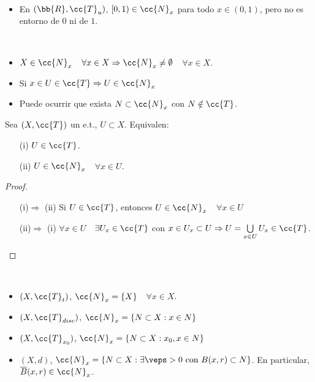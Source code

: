 \begin{ejemplo}\
    \begin{itemize}
        \item En $(\bb{R}, \cc{T}_u)$, $[0,1)\in \cc{N}_x$ para todo $x\in (0,1)$, pero no es entorno de $0$ ni de $1$.
    \end{itemize}
    \endsquare
\end{ejemplo}

\begin{observacion}\
    \begin{itemize}
        \item $X\in \cc{N}_x$\ \ $\forall x \in X\Rightarrow \cc{N}_x\neq \emptyset$\ \ $\forall x\in X$.
        \item Si $x\in U \in \cc{T}\Rightarrow U\in \cc{N}_x$
        \item Puede ocurrir que exista $N\subset \cc{N}_x$ con $N\notin \cc{T}$.
    \end{itemize}
    \endsquare
\end{observacion}

\begin{prop}
    Sea $(X,\cc{T})$ un e.t., $U\subset X$. Equivalen:
    \begin{enumerate}
        \item[(i)] $U\in \cc{T}$.
        \item[(ii)] $U\in \cc{N}_x$\ \ $\forall x \in U$.
    \end{enumerate}

    \begin{proof}\
        \begin{enumerate}
            \item[(i)$\Rightarrow$ (ii)] Si $U\in \cc{T}$, entonces $U\in \cc{N}_x$\ \ $\forall x\in U$
            \item[(ii)$\Rightarrow$ (i)] $\forall x \in U $\ \ $\exists U_x \in \cc{T}$ con $x\in U_x\subset U \Rightarrow U = \bigcup\limits_{x\in U}U_x \in \cc{T}$.
        \end{enumerate}
    \end{proof}
\end{prop}

\begin{ejemplo}\
    \begin{itemize}   
        \item $(X,\cc{T}_t)$, $\cc{N}_x=\{X\}$\ \ $\forall x \in X$.
        \item $(X,\cc{T}_{disc})$, $\cc{N}_x=\{N\subset X : x\in N\}$
        \item $(X,\cc{T}_{x_0})$, $\cc{N}_x = \{N \subset X : x_0,x\in N\}$
        \item $(X,d)$, $\cc{N}_x = \{N\subset X : \exists \veps > 0 \text{ con } B(x,r)\subset N\}$. En particular, $\overline{B}(x,r)\in \cc{N}_x$.
    \end{itemize}
    \endsquare
\end{ejemplo}

